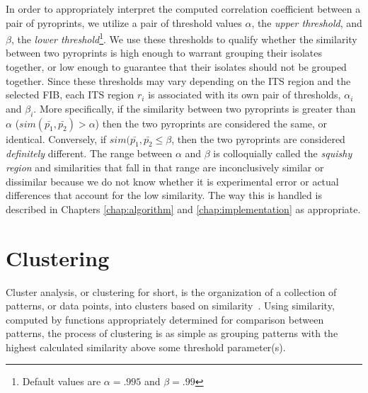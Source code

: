 \documentclass[12pt]{ucthesis}
\begin{document}
      In order to appropriately interpret the computed correlation coefficient
      between a pair of pyroprints, we utilize a pair of threshold values
      $\alpha$, the \textit{upper threshold}, and $\beta$, the \textit{lower
      threshold}\footnote{Default values are $\alpha = .995$ and $\beta =
      .99$}. We use these thresholds to qualify whether the
      similarity between two pyroprints is high enough to warrant grouping
      their isolates together, or low enough to guarantee that their isolates
      should not be grouped together. Since these thresholds may vary depending
      on the ITS region and the selected FIB, each ITS region
      $r_i$ is associated with its own pair of thresholds, $\alpha_i$ and $\beta_i$.
      More specifically, if the similarity between two pyroprints is greater
      than $\alpha$ ($sim(\bar{p_1}, \bar{p_2}) > \alpha$) then the two
      pyroprints are considered the same, or identical. Conversely, if
      $sim(\bar{p_1}, \bar{p_2} \le \beta$, then the two pyroprints are
      considered \textit{definitely} different. The range between $\alpha$ and
      $\beta$ is colloquially called the \textit{squishy region} and
      similarities that fall in that range are inconclusively similar or
      dissimilar because we do not know whether it is experimental error or
      actual differences that account for the low similarity. The way this is
      handled is described in Chapters \ref{chap:algorithm} and
      \ref{chap:implementation} as appropriate.

   \section{Clustering}\label{sec:clustering}
      Cluster analysis, or clustering for short, is the organization of a
      collection of patterns, or data points, into clusters based on
      similarity~\cite{Jain:DataClustering}. Using similarity, computed by
      functions appropriately determined for comparison between patterns, the
      process of clustering is as simple as grouping patterns with the highest
      calculated similarity above some threshold parameter(s).
\end{document}
